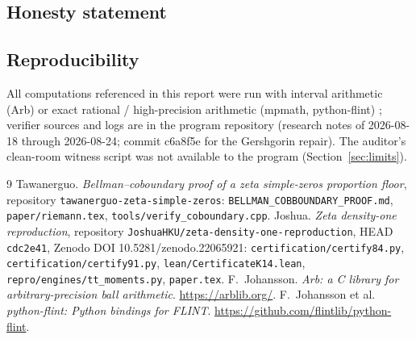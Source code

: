\documentclass[11pt]{article}
\begin{document}
\subsection*{Honesty statement}
\label{sec:honesty}
\begin{center}
\end{center}

\subsection*{Reproducibility}
All computations referenced in this report were run with interval arithmetic
(Arb) or exact rational / high-precision arithmetic (mpmath, python-flint)
\cite{arb,flint}; verifier sources and logs are in the program repository
(research notes of 2026-08-18 through 2026-08-24; commit c6a8f5e for the
Gershgorin repair). The auditor's clean-room witness script was not available
to the program (Section~\ref{sec:limits}).

\begin{thebibliography}{9}
Tawanerguo. \emph{Bellman--coboundary proof of a zeta simple-zeros proportion
floor}, repository \texttt{tawanerguo-zeta-simple-zeros}:
\texttt{BELLMAN\_COBBOUNDARY\_PROOF.md}, \texttt{paper/riemann.tex},
\texttt{tools/verify\_coboundary.cpp}.
Joshua. \emph{Zeta density-one reproduction},
repository \texttt{JoshuaHKU/zeta-density-one-reproduction}, HEAD
\texttt{cdc2e41}, Zenodo DOI 10.5281/zenodo.22065921:
\texttt{certification/certify84.py}, \texttt{certification/certify91.py},
\texttt{lean/CertificateK14.lean}, \texttt{repro/engines/tt\_moments.py},
\texttt{paper.tex}.
F.~Johansson. \emph{Arb: a C library for arbitrary-precision ball
arithmetic}. \url{https://arblib.org/}.
F.~Johansson et al. \emph{python-flint: Python bindings for FLINT}.
\url{https://github.com/flintlib/python-flint}.
\end{thebibliography}
\end{document}
